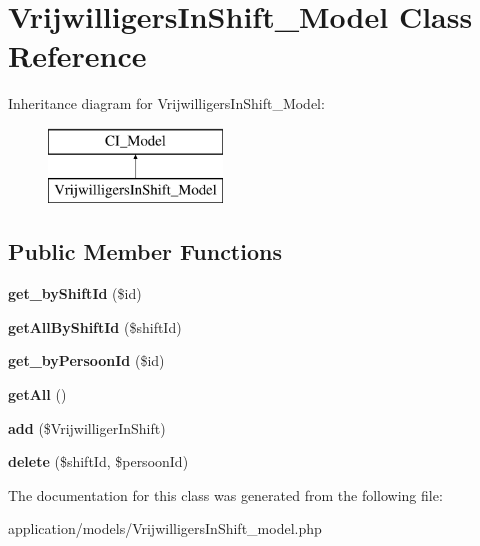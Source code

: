 \hypertarget{class_vrijwilligers_in_shift___model}{}\section{Vrijwilligers\+In\+Shift\+\_\+\+Model Class Reference}
\label{class_vrijwilligers_in_shift___model}
Inheritance diagram for Vrijwilligers\+In\+Shift\+\_\+\+Model\+:\begin{figure}[H]
\begin{center}
\leavevmode
\includegraphics[height=2.000000cm]{class_vrijwilligers_in_shift___model}
\end{center}
\end{figure}
\subsection*{Public Member Functions}
\begin{DoxyCompactItemize}
\item 
\mbox{\label{class_vrijwilligers_in_shift___model_a55c8d969239cd8c2f167b004ec886514}} 
{\bfseries get\+\_\+by\+Shift\+Id} (\$id)
\item 
\mbox{\label{class_vrijwilligers_in_shift___model_a35126fd2943dda2b4d2d9ad9b6ca127f}} 
{\bfseries get\+All\+By\+Shift\+Id} (\$shift\+Id)
\item 
\mbox{\label{class_vrijwilligers_in_shift___model_aa04bd86e024fed6b73b051c9cbb9ec52}} 
{\bfseries get\+\_\+by\+Persoon\+Id} (\$id)
\item 
\mbox{\label{class_vrijwilligers_in_shift___model_aba0d5b303383fb5b1fabb5fd01cd3800}} 
{\bfseries get\+All} ()
\item 
\mbox{\label{class_vrijwilligers_in_shift___model_ad5245963891f83f9da52a0b71d1a573f}} 
{\bfseries add} (\$Vrijwilliger\+In\+Shift)
\item 
\mbox{\label{class_vrijwilligers_in_shift___model_a0b51c4f3d41dcc04514f7ea8405f4ed3}} 
{\bfseries delete} (\$shift\+Id, \$persoon\+Id)
\end{DoxyCompactItemize}


The documentation for this class was generated from the following file\+:\begin{DoxyCompactItemize}
\item 
application/models/Vrijwilligers\+In\+Shift\+\_\+model.\+php\end{DoxyCompactItemize}
